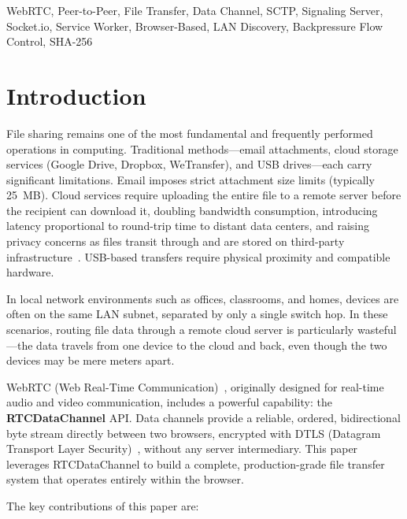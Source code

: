\documentclass[conference]{IEEEtran}
\begin{document}
\begin{IEEEkeywords}
WebRTC, Peer-to-Peer, File Transfer, Data Channel, SCTP, Signaling Server, Socket.io, Service Worker, Browser-Based, LAN Discovery, Backpressure Flow Control, SHA-256
\end{IEEEkeywords}

\section{Introduction}

File sharing remains one of the most fundamental and frequently performed operations in computing. Traditional methods---email attachments, cloud storage services (Google Drive, Dropbox, WeTransfer), and USB drives---each carry significant limitations. Email imposes strict attachment size limits (typically 25~MB). Cloud services require uploading the entire file to a remote server before the recipient can download it, doubling bandwidth consumption, introducing latency proportional to round-trip time to distant data centers, and raising privacy concerns as files transit through and are stored on third-party infrastructure~\cite{buyya2009cloud}. USB-based transfers require physical proximity and compatible hardware.

In local network environments such as offices, classrooms, and homes, devices are often on the same LAN subnet, separated by only a single switch hop. In these scenarios, routing file data through a remote cloud server is particularly wasteful---the data travels from one device to the cloud and back, even though the two devices may be mere meters apart.

WebRTC (Web Real-Time Communication)~\cite{johnston2014webrtc}, originally designed for real-time audio and video communication, includes a powerful capability: the \textbf{RTCDataChannel} API. Data channels provide a reliable, ordered, bidirectional byte stream directly between two browsers, encrypted with DTLS (Datagram Transport Layer Security)~\cite{rfc6347}, without any server intermediary. This paper leverages RTCDataChannel to build a complete, production-grade file transfer system that operates entirely within the browser.

The key contributions of this paper are:
\end{document}
